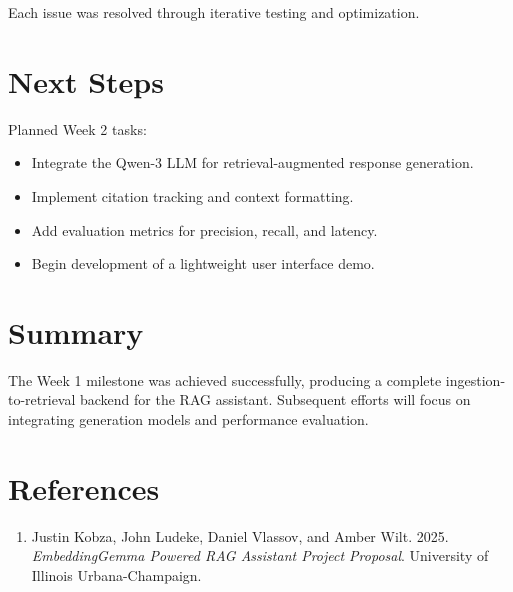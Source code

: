 \documentclass[sigconf]{acmart}
\begin{document}
Each issue was resolved through iterative testing and optimization.

\section{Next Steps}
Planned Week 2 tasks:
\begin{itemize}
  \item Integrate the Qwen-3 LLM for retrieval-augmented response generation.
  \item Implement citation tracking and context formatting.
  \item Add evaluation metrics for precision, recall, and latency.
  \item Begin development of a lightweight user interface demo.
\end{itemize}

\section{Summary}
The Week 1 milestone was achieved successfully, producing a complete ingestion-to-retrieval backend for the RAG assistant. Subsequent efforts will focus on integrating generation models and performance evaluation.

\section*{References}
\begin{enumerate}
\item Justin Kobza, John Ludeke, Daniel Vlassov, and Amber Wilt. 2025. \emph{EmbeddingGemma Powered RAG Assistant Project Proposal}. University of Illinois Urbana-Champaign.
\end{enumerate}
\end{document}
